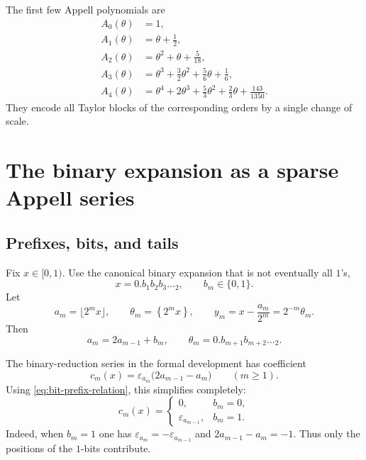 \documentclass[11pt,oneside]{article}
\theoremstyle{definition}
\theoremstyle{remark}
\newcommand{\eps}{\varepsilon}
\newcommand{\fracpart}[1]{\left\{#1\right\}}
\begin{document}
The first few Appell polynomials are
\begin{align*}
 A_0(\theta)&=1,\\
 A_1(\theta)&=\theta+\frac12,\\
 A_2(\theta)&=\theta^2+\theta+\frac5{18},\\
 A_3(\theta)&=\theta^3+\frac32\theta^2+\frac56\theta+\frac16,\\
 A_4(\theta)&=\theta^4+2\theta^3+\frac53\theta^2
              +\frac23\theta+\frac{143}{1350}.
\end{align*}
They encode all Taylor blocks of the corresponding orders by a single change
of scale.

\section{The binary expansion as a sparse Appell series}

\subsection{Prefixes, bits, and tails}

Fix $x\in[0,1)$.  Use the canonical binary expansion that is not eventually
all $1$'s,
\begin{equation}\label{eq:binary-x}
  x=0.b_1b_2b_3\ldots{}_2,
  \qquad b_m\in\{0,1\}.
\end{equation}
Let
\begin{equation}\label{eq:prefix-tail}
  a_m=\lfloor2^m x\rfloor,
  \qquad
  \theta_m=\fracpart{2^m x},
  \qquad
  y_m=x-\frac{a_m}{2^m}=2^{-m}\theta_m.
\end{equation}
Then
\begin{equation}\label{eq:bit-prefix-relation}
  a_m=2a_{m-1}+b_m,
  \qquad
  \theta_m=0.b_{m+1}b_{m+2}\ldots{}_2.
\end{equation}

The binary-reduction series in the formal development has coefficient
\begin{equation}\label{eq:source-coefficient}
  c_m(x)=\eps_{a_m}\bigl(2a_{m-1}-a_m\bigr)
  \qquad(m\ge1).
\end{equation}
Using \eqref{eq:bit-prefix-relation}, this simplifies completely:
\begin{equation}\label{eq:coefficient-simplified}
  c_m(x)=
  \begin{cases}
   0,&b_m=0,\\
   \eps_{a_{m-1}},&b_m=1.
  \end{cases}
\end{equation}
Indeed, when $b_m=1$ one has
$\eps_{a_m}=-\eps_{a_{m-1}}$ and $2a_{m-1}-a_m=-1$.
Thus only the positions of the $1$-bits contribute.
\end{document}
